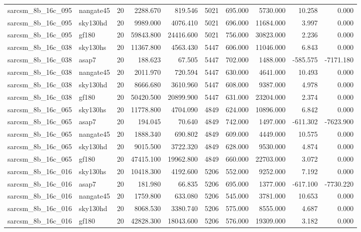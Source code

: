 \begin{longtable}{llrrrrrrrr}
sarcsm\_8b\_16c\_095 & nangate45 & 20 & 2288.670 & 819.546 & 5021 & 695.000 & 5730.000 & 10.258 & 0.000 \\
sarcsm\_8b\_16c\_095 & sky130hd & 20 & 9989.000 & 4076.410 & 5021 & 696.000 & 11684.000 & 3.997 & 0.000 \\
sarcsm\_8b\_16c\_095 & gf180 & 20 & 59843.800 & 24416.600 & 5021 & 756.000 & 30823.000 & 2.236 & 0.000 \\
sarcsm\_8b\_16c\_038 & sky130hs & 20 & 11367.800 & 4563.430 & 5447 & 606.000 & 11046.000 & 6.843 & 0.000 \\
sarcsm\_8b\_16c\_038 & asap7 & 20 & 188.623 & 67.505 & 5447 & 702.000 & 1488.000 & -585.575 & -7171.180 \\
sarcsm\_8b\_16c\_038 & nangate45 & 20 & 2011.970 & 720.594 & 5447 & 630.000 & 4641.000 & 10.493 & 0.000 \\
sarcsm\_8b\_16c\_038 & sky130hd & 20 & 8666.680 & 3610.960 & 5447 & 608.000 & 9387.000 & 4.978 & 0.000 \\
sarcsm\_8b\_16c\_038 & gf180 & 20 & 50420.500 & 20899.900 & 5447 & 631.000 & 23204.000 & 2.374 & 0.000 \\
sarcsm\_8b\_16c\_065 & sky130hs & 20 & 11778.800 & 4704.090 & 4849 & 624.000 & 10896.000 & 6.842 & 0.000 \\
sarcsm\_8b\_16c\_065 & asap7 & 20 & 194.045 & 70.640 & 4849 & 742.000 & 1497.000 & -611.302 & -7623.900 \\
sarcsm\_8b\_16c\_065 & nangate45 & 20 & 1888.340 & 690.802 & 4849 & 609.000 & 4449.000 & 10.575 & 0.000 \\
sarcsm\_8b\_16c\_065 & sky130hd & 20 & 9015.500 & 3722.320 & 4849 & 628.000 & 9530.000 & 4.874 & 0.000 \\
sarcsm\_8b\_16c\_065 & gf180 & 20 & 47415.100 & 19962.800 & 4849 & 660.000 & 22703.000 & 3.072 & 0.000 \\
sarcsm\_8b\_16c\_016 & sky130hs & 20 & 10418.300 & 4192.600 & 5206 & 552.000 & 9252.000 & 7.192 & 0.000 \\
sarcsm\_8b\_16c\_016 & asap7 & 20 & 181.980 & 66.835 & 5206 & 695.000 & 1377.000 & -617.100 & -7730.220 \\
sarcsm\_8b\_16c\_016 & nangate45 & 20 & 1759.800 & 633.080 & 5206 & 545.000 & 3781.000 & 10.653 & 0.000 \\
sarcsm\_8b\_16c\_016 & sky130hd & 20 & 8068.530 & 3380.740 & 5206 & 575.000 & 8555.000 & 4.687 & 0.000 \\
sarcsm\_8b\_16c\_016 & gf180 & 20 & 42828.300 & 18043.600 & 5206 & 576.000 & 19309.000 & 3.182 & 0.000 \\

\end{longtable}

